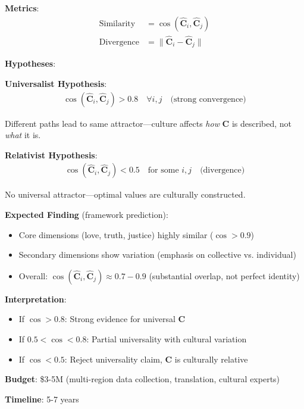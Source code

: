 \documentclass[11pt,a4paper]{article}
\theoremstyle{definition}
\theoremstyle{remark}
\begin{document}
\begin{enumerate}
\begin{protocol}
\textbf{Metrics}:
\begin{align}
\text{Similarity} &= \cos(\hat{\mathbf{C}}_i, \hat{\mathbf{C}}_j) \\
\text{Divergence} &= \|\hat{\mathbf{C}}_i - \hat{\mathbf{C}}_j\|
\end{align}

\textbf{Hypotheses}:

\textbf{Universalist Hypothesis}:
\begin{align}
\cos(\hat{\mathbf{C}}_i, \hat{\mathbf{C}}_j) > 0.8 \quad \forall i, j \quad \text{(strong convergence)}
\end{align}

Different paths lead to same attractor—culture affects \textit{how} \(\mathbf{C}\) is described, not \textit{what} it is.

\textbf{Relativist Hypothesis}:
\begin{align}
\cos(\hat{\mathbf{C}}_i, \hat{\mathbf{C}}_j) < 0.5 \quad \text{for some } i, j \quad \text{(divergence)}
\end{align}

No universal attractor—optimal values are culturally constructed.

\textbf{Expected Finding} (framework prediction):
\begin{itemize}
    \item Core dimensions (love, truth, justice) highly similar (\(\cos > 0.9\))
    \item Secondary dimensions show variation (emphasis on collective vs. individual)
    \item Overall: \(\cos(\hat{\mathbf{C}}_i, \hat{\mathbf{C}}_j) \approx 0.7-0.9\) (substantial overlap, not perfect identity)
\end{itemize}

\textbf{Interpretation}:
\begin{itemize}
    \item If \(\cos > 0.8\): Strong evidence for universal \(\mathbf{C}\)
    \item If \(0.5 < \cos < 0.8\): Partial universality with cultural variation
    \item If \(\cos < 0.5\): Reject universality claim, \(\mathbf{C}\) is culturally relative
\end{itemize}

\textbf{Budget}: \$3-5M (multi-region data collection, translation, cultural experts)

\textbf{Timeline}: 5-7 years
\end{protocol}


\end{enumerate}
\end{document}
